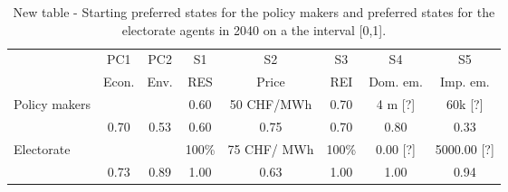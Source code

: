 \begin{table}
\begin{center}
\begin{tabular}{|l|c|c|c|c|c|c|c|} 
\hline
		& PC1		& PC2	&  S1	& S2			& S3		& S4			& S5			\\ 
		& Econ.		& Env.	& RES	& Price		& REI	& Dom. em.	& Imp. em.	\\ \hline
\multirow{2}{*}{Policy makers}
		& 			&		& 0.60	& 50 CHF/MWh	& 0.70	& 4 m [?]		& 60k [?]		\\ \cline{2-8}
		& 0.70		& 0.53	& 0.60	& 0.75		& 0.70	& 0.80		& 0.33		\\ \hline
\multirow{2}{*}{Electorate}
		&			&		&100\%	& 75 CHF/	MWh	& 100\%	& 0.00 [?]		& 5000.00	 [?]	\\ \cline{2-8}
		& 0.73		& 0.89	&1.00	& 0.63		& 1.00	& 1.00		& 0.94	 	\\ \hline
\end{tabular}
\end{center}
\caption{New table - Starting preferred states for the policy makers and preferred states for the electorate agents in 2040 on a the interval [0,1].}
\label{tab:}
\end{table}


%
%					
%					


